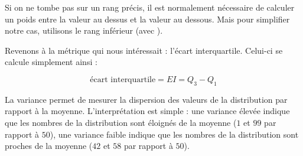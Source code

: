 \documentclass[11pt,a4paper]{article}
\begin{document}
Si on ne tombe pas sur un rang précis, il est normalement nécessaire de calculer un poids entre la valeur au dessus et la valeur au dessous.
Mais pour simplifier notre cas, utilisons le rang inférieur (avec ).

\bigskip



\bigskip

Revenons à la métrique qui nous intéressait : l'écart interquartile.
Celui-ci se calcule simplement ainsi :

\begin{center} %
\begin{equation*}
\text{écart interquartile} = EI = Q_{3} - Q_{1}
\end{equation*}
\end{center}

\bigskip



\bigskip


\bigskip

La variance permet de mesurer la dispersion des valeurs de la distribution par rapport à la moyenne.
L'interprétation est simple : une variance élevée indique que les nombres de la distribution sont éloignés de la moyenne ($ 1 $ et $ 99 $ par rapport à $ 50 $), une variance faible indique que les nombres de la distribution sont proches de la moyenne ($ 42 $ et $ 58 $ par rapport à $ 50 $).

\end{document}
